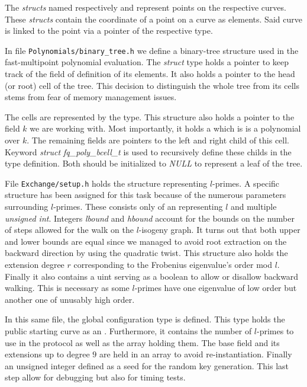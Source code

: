 \documentclass[../main.tex]{subfilesubs}
\begin{document}
The \textit{structs} named respectively  and  represent points on the respective curves.
These \textit{structs} contain the coordinate of a point on a curve as  elements.
Said curve is linked to the point via a pointer of the respective type.

In file \texttt{Polynomials/binary\_tree.h} we define a binary-tree structure used in the fast-multipoint polynomial evaluation.
The \textit{struct} type  holds a   pointer to keep track of the field of definition of its elements.
It also holds a pointer to the head (or root) cell of the tree.
This decision to distinguish the whole tree from its cells stems from fear of memory management issues.

The cells are represented by the  type.
This structure also holds a pointer to the field $k$ we are working with.
Most importantly, it holds a  which is is a polynomial over $k$.
The remaining fields are  pointers to the left and right child of this cell.
Keyword \textit{struct fq\_poly\_bcell\_t} is used to recursively define these childs in the type definition.
Both should be initialized to \textit{NULL} to represent a leaf of the tree.

File \texttt{Exchange/setup.h} holds the  structure representing $l$-primes.
A specific structure has been assigned for this task because of the numerous parameters surrounding $l$-primes.
These consists only of an  representing $l$ and multiple \textit{unsigned int}.
Integers \textit{lbound} and \textit{hbound} account for the bounds on the number of steps allowed for the walk on the $l$-isogeny graph.
It turns out that both upper and lower bounds are equal since we managed to avoid root extraction on the backward direction by using the quadratic twist.
This structure also holds the extension degree $r$ corresponding to the Frobenius eigenvalue's order mod $l$.
Finally it also contains a uint serving as a boolean to allow or disallow backward walking.
This is necessary as some $l$-primes have one eigenvalue of low order but another one of unusably high order.

In this same file, the global configuration type  is defined.
This type holds the public starting curve as an .
Furthermore, it contains the number of $l$-primes to use in the protocol as well as the  array holding them.
The base field and its extensions up to degree $9$  are held in an  array to avoid re-instantiation.
Finally an unsigned integer defined as a seed for the random key generation.
This last step allow for debugging but also for timing tests.
\end{document}
